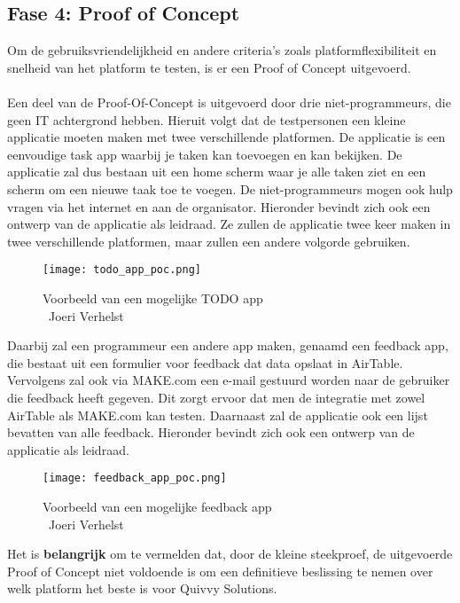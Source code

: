 \subsection*{Fase 4: Proof of Concept}%
\label{sec:proof-of-concept}
Om de gebruiksvriendelijkheid en andere criteria's zoals platformflexibiliteit en snelheid van het platform te testen, is er een Proof of Concept uitgevoerd. 
\\
\\
Een deel van de Proof-Of-Concept is uitgevoerd door drie niet-programmeurs, die geen IT achtergrond hebben. Hieruit volgt dat de testpersonen
een kleine applicatie moeten maken met twee verschillende platformen. De applicatie is een eenvoudige task app waarbij je taken kan toevoegen en kan bekijken.
De applicatie zal dus bestaan uit een home scherm waar je alle taken ziet en een scherm om een nieuwe taak toe te voegen. De niet-programmeurs mogen ook hulp vragen via het internet en aan de organisator.
Hieronder bevindt zich ook een ontwerp van de applicatie als leidraad. Ze zullen de applicatie twee keer maken in twee verschillende platformen, maar zullen een andere volgorde gebruiken.
\\
\begin{figure}[H]
    \centering
    \texttt{[image: todo\_app\_poc.png]}
    \caption[Voorbeeld van een mogelijke TODO app]{Voorbeeld van een mogelijke TODO app\\\textcopyright\ Joeri Verhelst}
    \label{fig:todo_app}
\end{figure}

Daarbij zal een programmeur een andere app maken, genaamd een feedback app, die bestaat uit een formulier voor feedback dat data opslaat in AirTable.
Vervolgens zal ook via MAKE.com een e-mail gestuurd worden naar de gebruiker die feedback heeft gegeven.
Dit zorgt ervoor dat men de integratie met zowel AirTable als MAKE.com kan testen. Daarnaast zal de applicatie ook een lijst bevatten van alle feedback.
Hieronder bevindt zich ook een ontwerp van de applicatie als leidraad.

\begin{figure}[H]
    \centering
    \texttt{[image: feedback\_app\_poc.png]}
    \caption[Voorbeeld van een mogelijke feedback app]{Voorbeeld van een mogelijke feedback app\\\textcopyright\ Joeri Verhelst}
    \label{fig:feedback_app}
\end{figure}
Het is \textbf{belangrijk} om te vermelden dat, door de kleine steekproef, de uitgevoerde Proof of Concept niet voldoende is om een 
definitieve beslissing te nemen over welk platform het beste is voor Quivvy Solutions.

